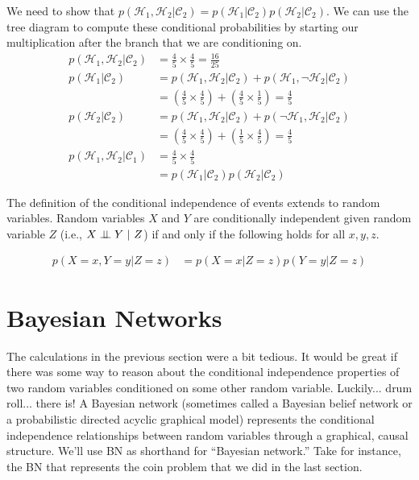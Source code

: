 \documentclass[assignment02_Solutions]{subfiles}
\begin{document}
\begin{exercise}[(20 minutes)]
\begin{boxedsolution}
We need to show that $p(\mathcal{H}_1 , \mathcal{H}_2 | \mathcal{C}_2) = p(\mathcal{H}_1 | \mathcal{C}_2) p(\mathcal{H}_2 | \mathcal{C}_2)$.  We can use the tree diagram to compute these conditional probabilities by starting our multiplication after the branch that we are conditioning on.
\begin{align}
p(\mathcal{H}_1 , \mathcal{H}_2 | \mathcal{C}_2)  &= \frac{4}{5} \times \frac{4}{5} = \frac{16}{25} \nonumber \\
p(\mathcal{H}_1 | \mathcal{C}_2) &= p(\mathcal{H}_1, \mathcal{H}_2 | \mathcal{C}_2) + p(\mathcal{H}_1, \neg \mathcal{H}_2 | \mathcal{C}_2) \nonumber \\
&= \left ( \frac{4}{5} \times \frac{4}{5} \right) + \left ( \frac{4}{5} \times \frac{1}{5} \right) = \frac{4}{5} \nonumber \\
p(\mathcal{H}_2 | \mathcal{C}_2) &= p(\mathcal{H}_1, \mathcal{H}_2 | \mathcal{C}_2) + p(\neg \mathcal{H}_1,  \mathcal{H}_2 | \mathcal{C}_2) \nonumber \\
&= \left ( \frac{4}{5} \times \frac{4}{5} \right) + \left ( \frac{1}{5} \times \frac{4}{5} \right) = \frac{4}{5} \nonumber \\
p(\mathcal{H}_1 , \mathcal{H}_2 | \mathcal{C}_1) &=  \frac{4}{5} \times \frac{4}{5} \nonumber \\
&= p(\mathcal{H}_1 | \mathcal{C}_2) p(\mathcal{H}_2 | \mathcal{C}_2) \nonumber
\end{align}
\end{boxedsolution}
\ees
\end{exercise}

The definition of the conditional independence of events extends to random variables.  Random variables $X$ and $Y$ are conditionally independent given random variable $Z$ (i.e., $X \perp\!\!\!\perp Y ~|~ Z$) if and only if the following holds for all $x, y, z$.

\begin{align}
p(X=x,Y=y | Z=z) &= p(X=x|Z=z) p(Y=y|Z=z)
\end{align}

\section{Bayesian Networks}

The calculations in the previous section were a bit tedious.  It would be great if there was some way to reason about the conditional independence properties of two random variables conditioned on some other random variable.  Luckily... drum roll... there is!  A Bayesian network (sometimes called a Bayesian belief network or a probabilistic directed acyclic graphical model) represents the conditional independence relationships between random variables through a graphical, causal structure.  We'll use BN as shorthand for ``Bayesian network.''  Take for instance, the BN that represents the coin problem that we did in the last section.
\end{document}
